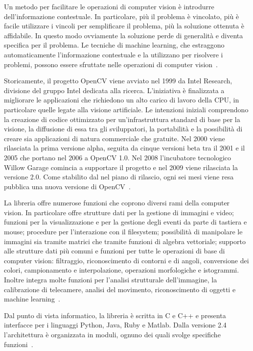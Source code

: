 				Un metodo per facilitare le operazioni di computer vision è introdurre dell'informazione contestuale. 
				In particolare, più il problema è vincolato, più è facile utilizzare i vincoli per semplificare il problema, più la soluzione ottenuta è affidabile.
				In questo modo ovviamente la soluzione perde di generalità e diventa specifica per il problema.
				Le tecniche di machine learning, che estraggono automaticamente l'informazione contestuale e la utilizzano per risolvere i problemi, possono essere sfruttate nelle operazioni di computer vision~\cite{bradski2008learning}.
				
				Storicamente, il progetto OpenCV viene avviato nel 1999 da Intel Research, divisione del gruppo Intel dedicata alla ricerca. 
				L'iniziativa è finalizzata a migliorare le applicazioni che richiedono un alto carico di lavoro della CPU, in particolare quelle legate alla visione artificiale. 
				Le intenzioni iniziali comprendono la creazione di codice ottimizzato per un'infrastruttura standard di base per la visione, la diffusione di essa tra gli sviluppatori, la portabilità e la possibilità di creare sia applicazioni di natura commerciale che gratuite. 
				Nel 2000 viene rilasciata la prima versione alpha, seguita da cinque versioni beta tra il 2001 e il 2005 che portano nel 2006 a \mbox{OpenCV} 1.0.	
				Nel 2008 l'incubatore tecnologico Willow Garage comincia a supportare il progetto e nel 2009 viene rilasciata la versione 2.0. 
				Come stabilito dal nel piano di rilascio, ogni sei mesi viene resa pubblica una nuova versione di \mbox{OpenCV}~\cite{OpenCV:ChangeLogs}.

				La libreria offre numerose funzioni che coprono diversi rami della computer vision.
				In particolare offre strutture dati per la gestione di immagini e video; funzioni per la visualizzazione e per la gestione degli eventi da parte di tastiera e mouse; procedure per l'interazione con il filesystem; possibilità di manipolare le immagini sia tramite matrici che tramite funzioni di algebra vettoriale; supporto alle strutture dati più comuni e funzioni per tutte le operazioni di base di computer vision: filtraggio, riconoscimento di contorni e di angoli, conversione dei colori, campionamento e interpolazione, operazioni morfologiche e istogrammi.
				Inoltre integra molte funzioni per l'analisi strutturale dell'immagine, la calibrazione di telecamere, analisi del movimento, riconoscimento di oggetti e machine learning~\cite{Agam2006}.
				
				Dal punto di vista informatico, la libreria è scritta in C e C++ e presenta interfacce per i linguaggi Python, Java, Ruby e Matlab.
				Dalla versione 2.4 l'architettura è organizzata in moduli, ognuno dei quali svolge specifiche funzioni~\cite{OpenCVDoc}. 
				


